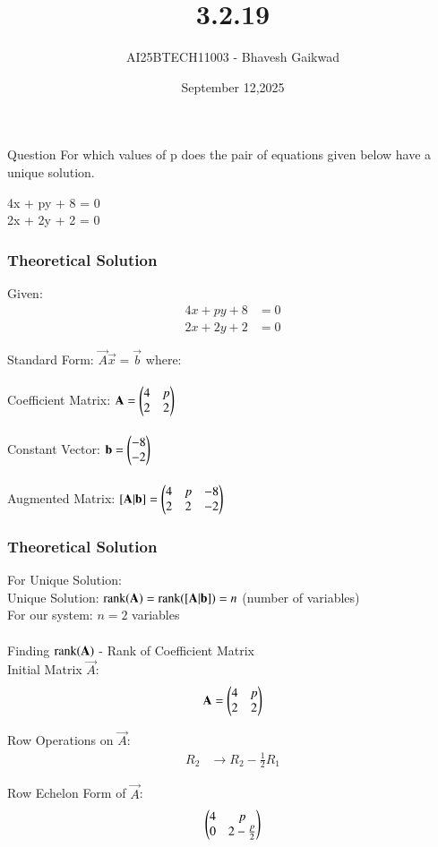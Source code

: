 \documentclass{beamer}
\title
{3.2.19}
\date{September 12,2025}
\author 
{AI25BTECH11003 - Bhavesh Gaikwad}
\begin{document}
\frame{\titlepage}
\begin{frame}{Question}
For which values of p does the pair of equations given below have a unique solution.
\begin{center}
4x + py + 8 = 0 \\
2x + 2y + 2 = 0 
\end{center}
\end{frame}


\begin{frame}[fragile]
    \frametitle{Theoretical Solution}
    Given:
\begin{align}
4x + py + 8 &= 0 \\
2x + 2y + 2 &= 0
\end{align}

Standard Form: $ \vec{A}\vec{x} = \vec{b} $ where:\\\\
Coefficient Matrix: $ \mathbf{A} = \begin{pmatrix}4 & p \\ 2 & 2\end{pmatrix} $\\\\
Constant Vector: $ \mathbf{b} = \begin{pmatrix}-8 \\ -2\end{pmatrix} $\\\\
Augmented Matrix: $ [\mathbf{A}|\mathbf{b}] = \begin{pmatrix}4 & p & -8 \\ 2 & 2 & -2\end{pmatrix} $
\end{frame}



\begin{frame}[fragile]
    \frametitle{Theoretical Solution}
For Unique Solution:\\
Unique Solution: $ \text{rank}(\mathbf{A}) = \text{rank}([\mathbf{A}|\mathbf{b}]) = n $ (number of variables)\\
For our system: $ n = 2 $ variables\\\\

Finding $\text{rank}(\mathbf{A})$ - Rank of Coefficient Matrix\\

Initial Matrix $ \vec{A} $:
\begin{equation}
\mathbf{A} = \begin{pmatrix}4 & p \\ 2 & 2\end{pmatrix}
\end{equation}

Row Operations on $\vec{A}$:
\begin{align}
R_2 &\to R_2 - \frac{1}{2}R_1
\end{align}

Row Echelon Form of $ \vec{A} $:
\begin{equation}
\begin{pmatrix}4 & p \\ 0 & 2 - \tfrac{p}{2}\end{pmatrix}
\end{equation}
\end{frame}
\end{document}
